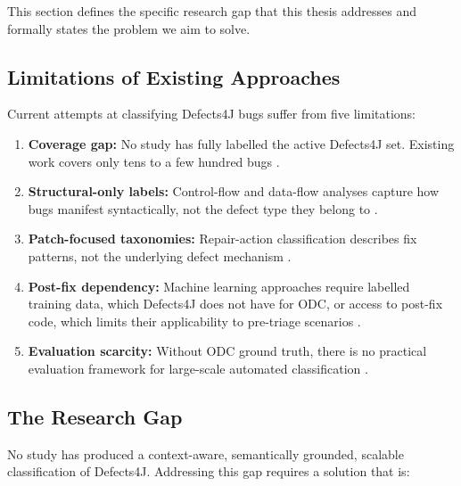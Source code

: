 \documentclass{iutbscthesis}
\begin{document}
This section defines the specific research gap that this thesis addresses and formally states the problem we aim to solve.

\subsection{Limitations of Existing Approaches}

Current attempts at classifying Defects4J bugs suffer from five limitations:

\begin{enumerate}
    \item \textbf{Coverage gap:} No study has fully labelled the active Defects4J set. Existing work covers only tens to a few hundred bugs \cite{sobreira2018dissection, vanderspuy2025anatomy, jiang2019manual}.
    \item \textbf{Structural-only labels:} Control-flow and data-flow analyses capture how bugs manifest syntactically, not the defect type they belong to \cite{vanderspuy2025anatomy}.
    \item \textbf{Patch-focused taxonomies:} Repair-action classification describes fix patterns, not the underlying defect mechanism \cite{sobreira2018dissection}.
    \item \textbf{Post-fix dependency:} Machine learning approaches require labelled training data, which Defects4J does not have for ODC, or access to post-fix code, which limits their applicability to pre-triage scenarios \cite{thung2012automatic}.
    \item \textbf{Evaluation scarcity:} Without ODC ground truth, there is no practical evaluation framework for large-scale automated classification \cite{andrade2025empirical}.
\end{enumerate}

\subsection{The Research Gap}

No study has produced a context-aware, semantically grounded, scalable classification of Defects4J. Addressing this gap requires a solution that is:
\end{document}
